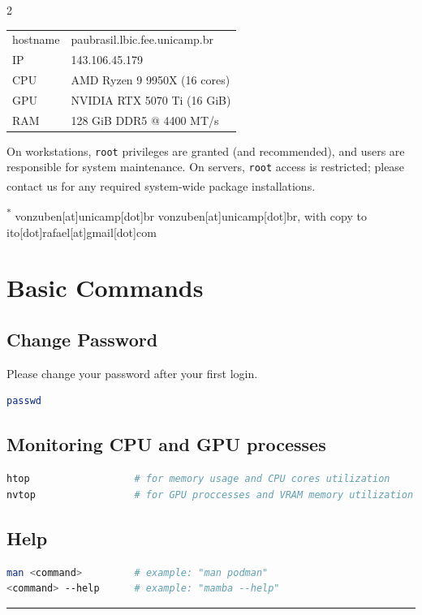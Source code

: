 \documentclass[a4paper, landscape]{article}
\begin{document}
\begin{multicols}{2}
\begin{center}
\begin{tabular}{ll}
\hline
hostname & paubrasil.lbic.fee.unicamp.br\\
IP & 143.106.45.179\\
CPU & AMD Ryzen 9 9950X (16 cores)\\
GPU & NVIDIA RTX 5070 Ti (16 GiB)\\
RAM & 128 GiB DDR5 @ 4400 MT/s\\
\hline
\end{tabular}
\end{center}

On workstations, \texttt{root} privileges are granted (and recommended), and users are responsible for system maintenance. On servers, \texttt{root} access is restricted; please contact us\textsuperscript{\dag} for any required system-wide package installations.

\vfill
\noindent \footnotesize \textsuperscript{*} vonzuben[at]unicamp[dot]br
\newline
\noindent \footnotesize \textsuperscript{\dag} vonzuben[at]unicamp[dot]br, with copy to ito[dot]rafael[at]gmail[dot]com
\normalsize
\columnbreak
\section*{Basic Commands}
\label{sec:org2a12f0f}
\subsection*{Change Password}
\label{sec:org93b0c75}
Please change your password after your first login.
\begin{lstlisting}[language=sh,numbers=none]
passwd
\end{lstlisting}
\subsection*{Monitoring CPU and GPU processes}
\label{sec:org815a97e}
\begin{lstlisting}[language=sh,numbers=none]
htop                  # for memory usage and CPU cores utilization
nvtop                 # for GPU proccesses and VRAM memory utilization
\end{lstlisting}
\subsection*{Help}
\label{sec:orgd6d513d}
\begin{lstlisting}[language=sh,numbers=none]
man <command>         # example: "man podman"
<command> --help      # example: "mamba --help"
\end{lstlisting}
\vspace{0.25em}\noindent\rule{\linewidth}{0.4pt}\vspace{-0.5em}

\end{multicols}
\end{document}
